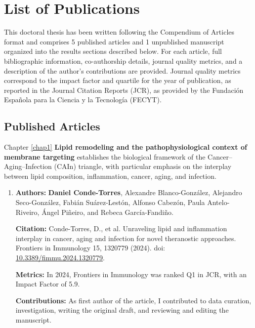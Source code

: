 \newpage
{}
\section*{List of Publications} %
{} %

\vspace{0.3cm} %

This doctoral thesis has been written following the Compendium of Articles format and comprises 5 published articles and 1 unpublished manuscript organized into the results sections described below. For each article, full bibliographic information, co-authorship details, journal quality metrics, and a description of the author's contributions are provided. Journal quality metrics correspond to the impact factor and quartile for the year of publication, as reported in the Journal Citation Reports (JCR), as provided by the Fundación Española para la Ciencia y la Tecnología (FECYT).



\subsection*{\Large Published Articles}
\vspace{0.2cm}
Chapter \ref{chap1} \textbf{Lipid remodeling and the pathophysiological context of membrane targeting} establishes the biological framework of the Cancer--Aging--Infection (CAIn) triangle, with particular emphasis on the interplay between lipid composition, inflammation, cancer, aging, and infection.
\begin{enumerate}
    \item \textbf{Authors:} \textbf{Daniel Conde-Torres}, Alexandre Blanco-González, Alejandro Seco-González, Fabián Suárez-Lestón, Alfonso Cabezón, Paula Antelo-Riveiro, Ángel Piñeiro, and Rebeca García-Fandiño.
    
    \textbf{Citation:} Conde-Torres, D., et al. Unraveling lipid and inflammation interplay in cancer, aging and infection for novel theranostic approaches. Frontiers in Immunology 15, 1320779 (2024). doi: \href{https://doi.org/10.3389/fimmu.2024.1320779}{10.3389/fimmu.2024.1320779}.

     \textbf{Metrics:} In 2024, Frontiers in Immunology was ranked Q1 in JCR, with an Impact Factor of 5.9.

    \textbf{Contributions:} As first author of the article, I contributed to data curation, investigation, writing the original draft, and reviewing and editing the manuscript.
\end{enumerate}


